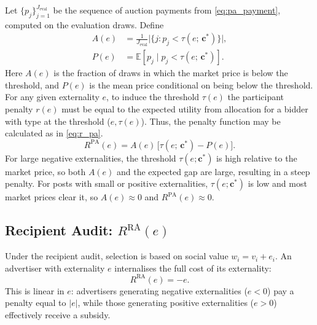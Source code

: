 \documentclass[11pt]{article}
\newcommand{\bsc}{\mathbf{c}}
\begin{document}
Let $\{p_j\}_{j=1}^{J_{\text{eval}}}$ be the sequence of auction payments from
\eqref{eq:pa_payment}, computed on the evaluation draws.  Define
\begin{align}
    A(e) &= \frac{1}{J_{\text{eval}}}\bigl|\bigl\{ j : p_j < \tau(e;\,\bsc^*) \bigr\}\bigr|,
    \label{eq:A_e} \\
    P(e) &= \mathbb{E}\!\left[p_j \;\big|\; p_j < \tau(e;\,\bsc^*)\right].
    \label{eq:P_e}
\end{align}
Here $A(e)$ is the fraction of draws in which the market price is below the
threshold, and $P(e)$ is the mean price conditional on being below the threshold.
For any given externality $e$, to induce the threshold $\tau(e)$ the participant 
penalty $r(e)$ must be equal to the expected utility from allocation for a bidder 
with type at the threshold ($e,\tau(e)$). Thus, the penalty function may be calculated 
as in \eqref{eq:r_pa}.
\begin{equation}
    R^{\text{PA}}(e) = A(e)\,\bigl[\tau(e;\,\bsc^*) - P(e)\bigr].
    \label{eq:r_pa}
\end{equation}
For large negative externalities, the threshold $\tau(e;\bsc^*)$ is high relative
to the market price, so both $A(e)$ and the expected gap are large, resulting in a
steep penalty.  For posts with small or positive externalities, $\tau(e;\bsc^*)$ is
low and most market prices clear it, so $A(e) \approx 0$ and $R^{\text{PA}}(e)
\approx 0$.

\subsection{Recipient Audit: $R^{\text{RA}}(e)$}
\label{sec:r_ra}

Under the recipient audit, selection is based on social value $w_i = v_i + e_i$.
An advertiser with externality $e$ internalises the full cost of its externality:
\begin{equation}
    R^{\text{RA}}(e) = -e.
    \label{eq:r_ra}
\end{equation}
This is linear in $e$: advertisers generating negative externalities ($e < 0$)
pay a penalty equal to $|e|$, while those generating positive externalities
($e > 0$) effectively receive a subsidy.
\end{document}
